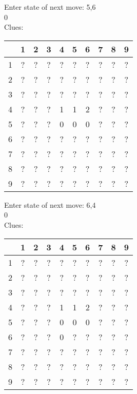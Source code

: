 Enter state of next move: 5,6\\
0\\
Clues:\\
\begin{tabular}{|c|c|c|c|c|c|c|c|c|c|}
\hline
  & 1 & 2 & 3 & 4 & 5 & 6 & 7 & 8 & 9\\
\hline
1 & ? & ? & ? & ? & ? & ? & ? & ? & ?\\
\hline
2 & ? & ? & ? & ? & ? & ? & ? & ? & ?\\
\hline
3 & ? & ? & ? & ? & ? & ? & ? & ? & ?\\
\hline
4 & ? & ? & ? & 1 & 1 & 2 & ? & ? & ?\\
\hline
5 & ? & ? & ? & 0 & 0 & 0 & ? & ? & ?\\
\hline
6 & ? & ? & ? & ? & ? & ? & ? & ? & ?\\
\hline
7 & ? & ? & ? & ? & ? & ? & ? & ? & ?\\
\hline
8 & ? & ? & ? & ? & ? & ? & ? & ? & ?\\
\hline
9 & ? & ? & ? & ? & ? & ? & ? & ? & ?\\
\hline
\end{tabular}

Enter state of next move: 6,4\\
0\\
Clues:\\
\begin{tabular}{|c|c|c|c|c|c|c|c|c|c|}
\hline
  & 1 & 2 & 3 & 4 & 5 & 6 & 7 & 8 & 9\\
\hline
1 & ? & ? & ? & ? & ? & ? & ? & ? & ?\\
\hline
2 & ? & ? & ? & ? & ? & ? & ? & ? & ?\\
\hline
3 & ? & ? & ? & ? & ? & ? & ? & ? & ?\\
\hline
4 & ? & ? & ? & 1 & 1 & 2 & ? & ? & ?\\
\hline
5 & ? & ? & ? & 0 & 0 & 0 & ? & ? & ?\\
\hline
6 & ? & ? & ? & 0 & ? & ? & ? & ? & ?\\
\hline
7 & ? & ? & ? & ? & ? & ? & ? & ? & ?\\
\hline
8 & ? & ? & ? & ? & ? & ? & ? & ? & ?\\
\hline
9 & ? & ? & ? & ? & ? & ? & ? & ? & ?\\
\hline
\end{tabular}


